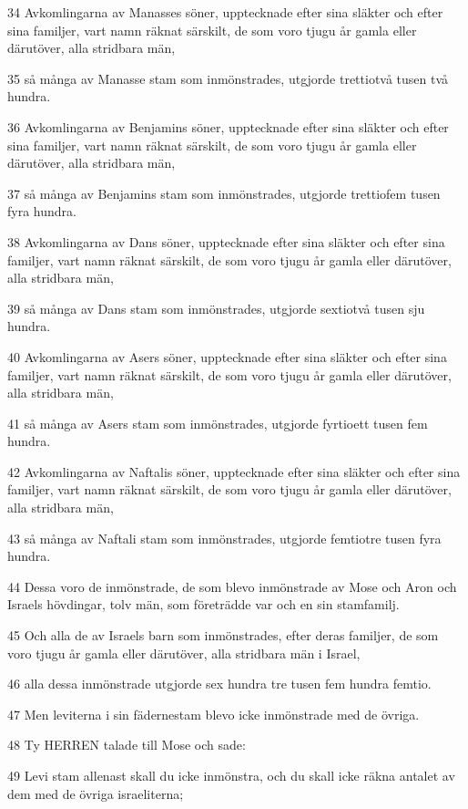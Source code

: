 \par 34 Avkomlingarna av Manasses söner, upptecknade efter sina släkter och efter sina familjer, vart namn räknat särskilt, de som voro tjugu år gamla eller därutöver, alla stridbara män,
\par 35 så många av Manasse stam som inmönstrades, utgjorde trettiotvå tusen två hundra.
\par 36 Avkomlingarna av Benjamins söner, upptecknade efter sina släkter och efter sina familjer, vart namn räknat särskilt, de som voro tjugu år gamla eller därutöver, alla stridbara män,
\par 37 så många av Benjamins stam som inmönstrades, utgjorde trettiofem tusen fyra hundra.
\par 38 Avkomlingarna av Dans söner, upptecknade efter sina släkter och efter sina familjer, vart namn räknat särskilt, de som voro tjugu år gamla eller därutöver, alla stridbara män,
\par 39 så många av Dans stam som inmönstrades, utgjorde sextiotvå tusen sju hundra.
\par 40 Avkomlingarna av Asers söner, upptecknade efter sina släkter och efter sina familjer, vart namn räknat särskilt, de som voro tjugu år gamla eller därutöver, alla stridbara män,
\par 41 så många av Asers stam som inmönstrades, utgjorde fyrtioett tusen fem hundra.
\par 42 Avkomlingarna av Naftalis söner, upptecknade efter sina släkter och efter sina familjer, vart namn räknat särskilt, de som voro tjugu år gamla eller därutöver, alla stridbara män,
\par 43 så många av Naftali stam som inmönstrades, utgjorde femtiotre tusen fyra hundra.
\par 44 Dessa voro de inmönstrade, de som blevo inmönstrade av Mose och Aron och Israels hövdingar, tolv män, som företrädde var och en sin stamfamilj.
\par 45 Och alla de av Israels barn som inmönstrades, efter deras familjer, de som voro tjugu år gamla eller därutöver, alla stridbara män i Israel,
\par 46 alla dessa inmönstrade utgjorde sex hundra tre tusen fem hundra femtio.
\par 47 Men leviterna i sin fädernestam blevo icke inmönstrade med de övriga.
\par 48 Ty HERREN talade till Mose och sade:
\par 49 Levi stam allenast skall du icke inmönstra, och du skall icke räkna antalet av dem med de övriga israeliterna;
